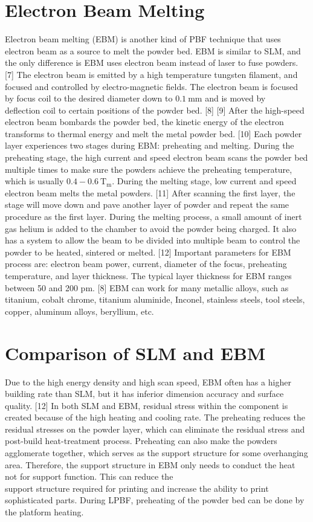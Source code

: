\documentclass[10pt]{article}
\begin{document}
\section*{Electron Beam Melting}
Electron beam melting (EBM) is another kind of PBF technique that uses electron beam as a source to melt the powder bed. EBM is similar to SLM, and the only difference is EBM uses electron beam instead of laser to fuse powders. [7] The electron beam is emitted by a high temperature tungsten filament, and focused and controlled by electro-magnetic fields. The electron beam is focused by focus coil to the desired diameter down to $0.1 \mathrm{~mm}$ and is moved by\\
deflection coil to certain positions of the powder bed. [8] [9] After the high-speed electron beam bombards the powder bed, the kinetic energy of the electron transforms to thermal energy and melt the metal powder bed. [10] Each powder layer experiences two stages during EBM: preheating and melting. During the preheating stage, the high current and speed electron beam scans the powder bed multiple times to make sure the powders achieve the preheating temperature, which is usually $0.4-0.6 \mathrm{~T}_{\mathrm{m}}$. During the melting stage, low current and speed electron beam melts the metal powders. [11] After scanning the first layer, the stage will move down and pave another layer of powder and repeat the same procedure as the first layer. During the melting process, a small amount of inert gas helium is added to the chamber to avoid the powder being charged. It also has a system to allow the beam to be divided into multiple beam to control the powder to be heated, sintered or melted. [12] Important parameters for EBM process are: electron beam power, current, diameter of the focus, preheating temperature, and layer thickness. The typical layer thickness for EBM ranges between 50 and 200 pm. [8] EBM can work for many metallic alloys, such as titanium, cobalt chrome, titanium aluminide, Inconel, stainless steels, tool steels, copper, aluminum alloys, beryllium, etc.

\section*{Comparison of SLM and EBM}
Due to the high energy density and high scan speed, EBM often has a higher building rate than SLM, but it has inferior dimension accuracy and surface quality. [12] In both SLM and EBM, residual stress within the component is created because of the high heating and cooling rate. The preheating reduces the residual stresses on the powder layer, which can eliminate the residual stress and post-build heat-treatment process. Preheating can also make the powders agglomerate together, which serves as the support structure for some overhanging area. Therefore, the support structure in EBM only needs to conduct the heat not for support function. This can reduce the\\
support structure required for printing and increase the ability to print sophisticated parts. During LPBF, preheating of the powder bed can be done by the platform heating.
\end{document}
